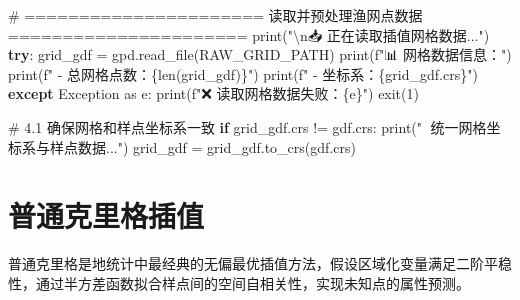 \documentclass[
  letterpaper,
  DIV=11,
  numbers=noendperiod]{scrreprt}
\newenvironment{Shaded}{\begin{snugshade}}{\end{snugshade}}
\newcommand{\BuiltInTok}[1]{\textcolor[rgb]{0.00,0.23,0.31}{#1}}
\newcommand{\CharTok}[1]{\textcolor[rgb]{0.13,0.47,0.30}{#1}}
\newcommand{\CommentTok}[1]{\textcolor[rgb]{0.37,0.37,0.37}{#1}}
\newcommand{\ControlFlowTok}[1]{\textcolor[rgb]{0.00,0.23,0.31}{\textbf{#1}}}
\newcommand{\DecValTok}[1]{\textcolor[rgb]{0.68,0.00,0.00}{#1}}
\newcommand{\ImportTok}[1]{\textcolor[rgb]{0.00,0.46,0.62}{#1}}
\newcommand{\NormalTok}[1]{\textcolor[rgb]{0.00,0.23,0.31}{#1}}
\newcommand{\OperatorTok}[1]{\textcolor[rgb]{0.37,0.37,0.37}{#1}}
\newcommand{\PreprocessorTok}[1]{\textcolor[rgb]{0.68,0.00,0.00}{#1}}
\newcommand{\SpecialCharTok}[1]{\textcolor[rgb]{0.37,0.37,0.37}{#1}}
\newcommand{\SpecialStringTok}[1]{\textcolor[rgb]{0.13,0.47,0.30}{#1}}
\newcommand{\StringTok}[1]{\textcolor[rgb]{0.13,0.47,0.30}{#1}}
\begin{document}
\begin{Shaded}
\begin{Highlighting}[]
\CommentTok{\# ====================== 读取并预处理渔网点数据 ======================}
\BuiltInTok{print}\NormalTok{(}\StringTok{"}\CharTok{\textbackslash{}n}\StringTok{📥 正在读取插值网格数据..."}\NormalTok{)}
\ControlFlowTok{try}\NormalTok{:}
\NormalTok{    grid\_gdf }\OperatorTok{=}\NormalTok{ gpd.read\_file(RAW\_GRID\_PATH)}
    \BuiltInTok{print}\NormalTok{(}\SpecialStringTok{f"📊 网格数据信息："}\NormalTok{)}
    \BuiltInTok{print}\NormalTok{(}\SpecialStringTok{f"   {-} 总网格点数：}\SpecialCharTok{\{}\BuiltInTok{len}\NormalTok{(grid\_gdf)}\SpecialCharTok{\}}\SpecialStringTok{"}\NormalTok{)}
    \BuiltInTok{print}\NormalTok{(}\SpecialStringTok{f"   {-} 坐标系：}\SpecialCharTok{\{}\NormalTok{grid\_gdf}\SpecialCharTok{.}\NormalTok{crs}\SpecialCharTok{\}}\SpecialStringTok{"}\NormalTok{)}
\ControlFlowTok{except} \PreprocessorTok{Exception} \ImportTok{as}\NormalTok{ e:}
    \BuiltInTok{print}\NormalTok{(}\SpecialStringTok{f"❌ 读取网格数据失败：}\SpecialCharTok{\{}\NormalTok{e}\SpecialCharTok{\}}\SpecialStringTok{"}\NormalTok{)}
\NormalTok{    exit(}\DecValTok{1}\NormalTok{)}

\CommentTok{\# 4.1 确保网格和样点坐标系一致}
\ControlFlowTok{if}\NormalTok{ grid\_gdf.crs }\OperatorTok{!=}\NormalTok{ gdf.crs:}
    \BuiltInTok{print}\NormalTok{(}\StringTok{"🔄 统一网格坐标系与样点数据..."}\NormalTok{)}
\NormalTok{    grid\_gdf }\OperatorTok{=}\NormalTok{ grid\_gdf.to\_crs(gdf.crs)}
\end{Highlighting}
\end{Shaded}


\chapter{普通克里格插值}\label{ux666eux901aux514bux91ccux683cux63d2ux503c}

普通克里格是地统计中最经典的无偏最优插值方法，假设区域化变量满足二阶平稳性，通过半方差函数拟合样点间的空间自相关性，实现未知点的属性预测。
\end{document}
